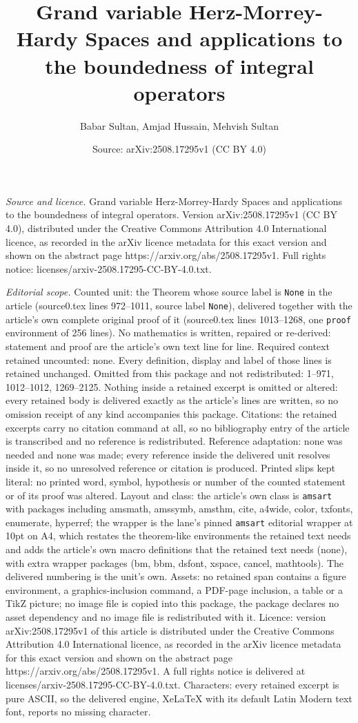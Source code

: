 \documentclass[10pt,a4paper]{amsart}
\title[Grand variable Herz-Morrey-Hardy Spaces and applications to ]{Grand variable Herz-Morrey-Hardy Spaces and applications to the boundedness of integral operators}
\author{Babar Sultan, Amjad Hussain, Mehvish Sultan}
\date{Source: arXiv:2508.17295v1 (CC BY 4.0)}
\begin{document}
\maketitle

\noindent\emph{Source and licence.} Grand variable Herz-Morrey-Hardy Spaces and applications to the boundedness of integral operators. Version arXiv:2508.17295v1 (CC BY 4.0), distributed under the Creative Commons Attribution 4.0 International licence, as recorded in the arXiv licence metadata for this exact version and shown on the abstract page https://arxiv.org/abs/2508.17295v1. Full rights notice: licenses/arxiv-2508.17295-CC-BY-4.0.txt.\par\smallskip

\noindent\textit{Editorial scope.} Counted unit: the Theorem whose source label is \texttt{None} in the article (source0.tex lines 972--1011, source label \texttt{None}), delivered together with the article's own complete original proof of it (source0.tex lines 1013--1268, one \texttt{proof} environment of 256 lines). No mathematics is written, repaired or re-derived: statement and proof are the article's own text line for line. Required context retained uncounted: none. Every definition, display and label of those lines is retained unchanged. Omitted from this package and not redistributed: 1--971, 1012--1012, 1269--2125. Nothing inside a retained excerpt is omitted or altered: every retained body is delivered exactly as the article's lines are written, so no omission receipt of any kind accompanies this package. Citations: the retained excerpts carry no citation command at all, so no bibliography entry of the article is transcribed and no reference is redistributed. Reference adaptation: none was needed and none was made; every reference inside the delivered unit resolves inside it, so no unresolved reference or citation is produced. Printed slips kept literal: no printed word, symbol, hypothesis or number of the counted statement or of its proof was altered. Layout and class: the article's own class is \texttt{amsart} with packages including amsmath, amssymb, amsthm, cite, a4wide, color, txfonts, enumerate, hyperref; the wrapper is the lane's pinned \texttt{amsart} editorial wrapper at 10pt on A4, which restates the theorem-like environments the retained text needs and adds the article's own macro definitions that the retained text needs (none), with extra wrapper packages (bm, bbm, dsfont, xspace, cancel, mathtools). The delivered numbering is the unit's own. Assets: no retained span contains a figure environment, a graphics-inclusion command, a PDF-page inclusion, a table or a TikZ picture; no image file is copied into this package, the package declares no asset dependency and no image file is redistributed with it. Licence: version arXiv:2508.17295v1 of this article is distributed under the Creative Commons Attribution 4.0 International licence, as recorded in the arXiv licence metadata for this exact version and shown on the abstract page https://arxiv.org/abs/2508.17295v1. A full rights notice is delivered at licenses/arxiv-2508.17295-CC-BY-4.0.txt. Characters: every retained excerpt is pure ASCII, so the delivered engine, XeLaTeX with its default Latin Modern text font, reports no missing character.
\end{document}
